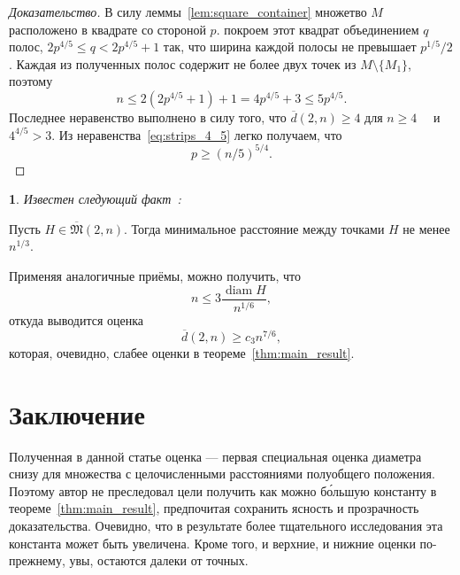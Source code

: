 \documentclass[11pt,twoside,draft
]{article}
\newtheorem{Remark}{\indent {\sc Remark}}
\begin{document}
\begin{proof}[Доказательство]
	В силу леммы~\ref{lem:square_container} множетво $M$ расположено в квадрате со стороной $p$.
	покроем этот квадрат объединением $q$ полос, $2p^{4/5} \leq q < 2p^{4/5} + 1$ так,
	что ширина каждой полосы не превышает $p^{1/5} / 2$.
	Каждая из полученных полос содержит не более двух точек из  $M\setminus\{M_1\}$,
	поэтому
	\begin{equation}
		\label{eq:strips_4_5}
		n \leq 2(2p^{4/5} + 1) + 1
		= 4p^{4/5}+3
		\leq 5 p^{4/5}
		.
	\end{equation}
	Последнее неравенство выполнено в силу того, что $\overline{d}(2,n) \geq 4$ для $n\geq 4$~~\cite{kurz2008minimum}
	и $4^{4/5}>3$.
	Из неравенства~\eqref{eq:strips_4_5} легко получаем, что
	\begin{equation}
		\label{eq:strips_5_4}
		p \geq (n/5) ^ {5/4}
		.
	\end{equation}
\end{proof}



\begin{Remark}
	Известен следующий факт~\cite[Следствие 1]{solymosi2003note}:
\end{Remark}

\begin{lemma}
	Пусть $H \in \overline {\mathfrak{M}}(2,n)$.
	Тогда минимальное расстояние между точками $H$ не менее $n^{1/3}$.
\end{lemma}
Применяя аналогичные приёмы, можно получить, что
\begin{equation}
	n \leq 3 \frac{\operatorname{diam} H }{n^{1/6}}
	,
\end{equation}
откуда выводится оценка
\begin{equation}
	\overline{d}(2,n) \geq c_3 n^{7/6}
	,
\end{equation}
которая, очевидно, слабее оценки в теореме~\ref{thm:main_result}.


\section{Заключение}
Полученная в данной статье оценка ---
первая специальная оценка диаметра снизу для множества с целочисленными расстояниями полуобщего положения.
Поэтому автор не преследовал цели получить как можно б\'{о}льшую константу в теореме~\ref{thm:main_result},
предпочитая сохранить ясность и прозрачность доказательства.
Очевидно, что в результате более тщательного исследования эта константа может быть увеличена.
Кроме того, и верхние, и нижние оценки по-прежнему, увы, остаются далеки от точных.
\end{document}
